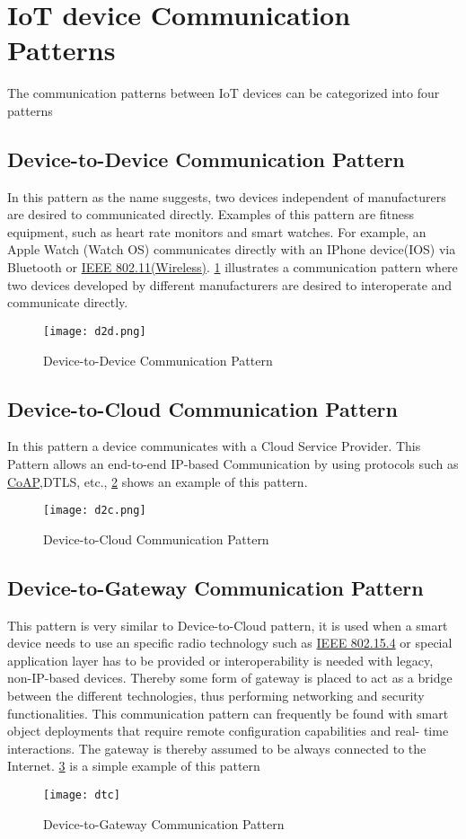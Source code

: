 \documentclass[10pt,journal,compsoc]{IEEEtran}
\begin{document}
	\section{IoT device Communication Patterns}
	The communication patterns between IoT devices can be categorized into four patterns

	\subsection{Device-to-Device Communication Pattern}\label{devicetodevicecommunication}
	In this pattern as the name suggests, two devices independent of
	manufacturers are desired to communicated directly. Examples of this pattern are fitness equipment, such as heart rate monitors and smart watches. For example, an Apple Watch (Watch OS) communicates directly with an IPhone device(IOS) via Bluetooth or \href{https://standards.ieee.org/ieee/802.11/7028/}{IEEE 802.11(Wireless)}. \cref{d2d} illustrates a communication pattern where two devices
	developed by different manufacturers are desired to interoperate and
	communicate directly.\cite{rfc7452}
	\begin{figure}[h]
		\texttt{[image: d2d.png]}
		\caption{Device-to-Device Communication Pattern \cite{rfc7452}}
		\label{d2d}
	\end{figure}
	\subsection{Device-to-Cloud Communication Pattern}\label{devicetocloud}
	In this pattern a device communicates with a Cloud Service Provider. This Pattern allows an end-to-end IP-based Communication by using protocols such as \href{coapprotocol}{CoAP},DTLS, etc., \cref{d2c-fig} shows an example of this pattern.
	\begin{figure}[h]
		\texttt{[image: d2c.png]}
		\caption{Device-to-Cloud Communication Pattern \cite{rfc7452}}
		\label{d2c-fig}
	\end{figure}
	\subsection{Device-to-Gateway Communication Pattern}\label{devicetogateway}
	This pattern is very similar to Device-to-Cloud pattern, it is used when a smart device needs to use an specific radio technology
	such as \href{https://standards.ieee.org/ieee/802.15.4/7029/}{IEEE 802.15.4} or special application layer has to be provided or interoperability is needed with legacy, non-IP-based devices.\cite{rfc7452} Thereby some form of gateway is placed to act as a bridge between the different technologies, thus performing networking and security functionalities.\cite{rfc7452} This communication pattern can frequently be found with smart object
	deployments that require remote configuration capabilities and real-
	time interactions. The gateway is thereby assumed to be always
	connected to the Internet\cite{rfc7452}. \cref{dtc} is a simple example of this pattern
	\begin{figure}[h]
		\texttt{[image: dtc]}
		\caption{Device-to-Gateway Communication Pattern\cite{rfc7452}}
		\label{dtc}
	\end{figure}
\end{document}
